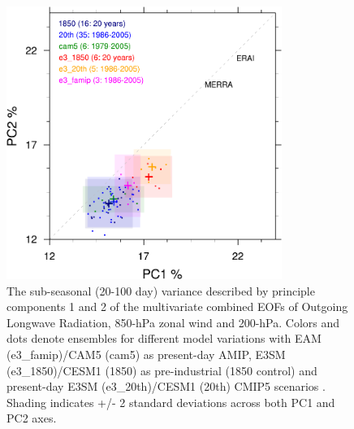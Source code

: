 \documentclass[draft,ms]{AGUTeX}
\begin{document}
\begin{article}
\begin{figure}[t]
  \begin{center}
   \noindent\includegraphics[width=0.8\textwidth]{./figs/f_pc1pc2.pdf}
  \end{center}
  \caption{The sub-seasonal (20-100 day) variance described by principle components 1 and 2 of the multivariate combined EOFs of Outgoing Longwave Radiation, 850-hPa zonal wind and 200-hPa. Colors and dots denote ensembles for different model variations with EAM (e3\_famip)/CAM5 (cam5) as present-day AMIP, E3SM (e3\_1850)/CESM1 (1850) as pre-industrial (1850 control) and present-day E3SM (e3\_20th)/CESM1 (20th) CMIP5 scenarios . Shading indicates +/- 2 standard deviations across both PC1 and PC2 axes.} 
\label{f_e3sm_pc1pc2}
\end{figure}


\end{article}
\end{document}
